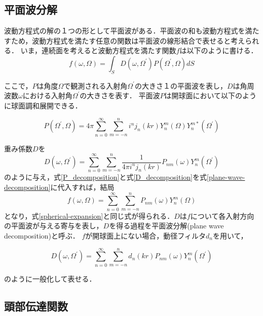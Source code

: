 \documentclass[a4paper]{jsarticle}
\begin{document}
\subsection{平面波分解}
波動方程式の解の１つの形として平面波がある．平面波の和も波動方程式を満たすため，波動方程式を満たす任意の関数は平面波の線形結合で表せると考えられる．
いま，連続面を考えると波動方程式を満たす関数$f$は以下のように書ける．
\begin{equation}
    \label{plane-wave-decomposition}
    f(\omega, \Omega)=\int_{S} D\left(\omega, \Omega^{\prime}\right) P\left(\Omega^{\prime}, \Omega\right) d S
\end{equation}

ここで，$P$は角度$\Omega$で観測される入射角$\Omega^\prime$の大きさ１の平面波を表し，$D$は角周波数$\omega$における入射角$\Omega^\prime$の大きさを表す．
平面波$P$は開球面において以下のように球面調和展開できる．

\begin{equation}
    \label{P_decomposition}
    P\left(\Omega^{\prime}, \Omega\right)=4 \pi \sum_{n=0}^{\infty} \sum_{m=-n}^{n} i^{n} j_{n}(k r) Y_{n}^{m}(\Omega) Y_{n}^{m *}\left(\Omega^{\prime}\right)
\end{equation}

重み係数$D$を
\begin{equation}
    \label{D_decomposition}
    D\left(\omega, \Omega^{\prime}\right)=\sum_{n=0}^{\infty} \sum_{m=-n}^{n} \frac{1}{4 \pi i^{n} j_{n}(k r)} P_{n m}(\omega) Y_{n}^{m}\left(\Omega^{\prime}\right)
\end{equation}
のように与え，式\ref{P_decomposition}と式\ref{D_decomposition}を式\ref{plane-wave-decomposition}に代入すれば，結局
$$
    f(\omega, \Omega)=\sum_{n=0}^{\infty} \sum_{m=-n}^{n} P_{n m}(\omega) Y_{n}^{m}(\Omega)
$$
となり，式\ref{spherical-expansion}と同じ式が得られる．$D$は$f$について各入射方向の平面波が与える寄与を表し，$D$を得る過程を平面波分解(plane wave decomposition)と呼ぶ．
$f$が開球面上にない場合，動径フィルタ$d_n$を用いて，

$$
    D\left(\omega, \Omega^{\prime}\right)=\sum_{n=0}^{\infty} \sum_{m=-n}^{n} d_{n}(k r) P_{n m}(\omega) Y_{n}^{m}\left(\Omega^{\prime}\right)
$$

のように一般化して表せる．

\subsection{頭部伝達関数}
\end{document}
